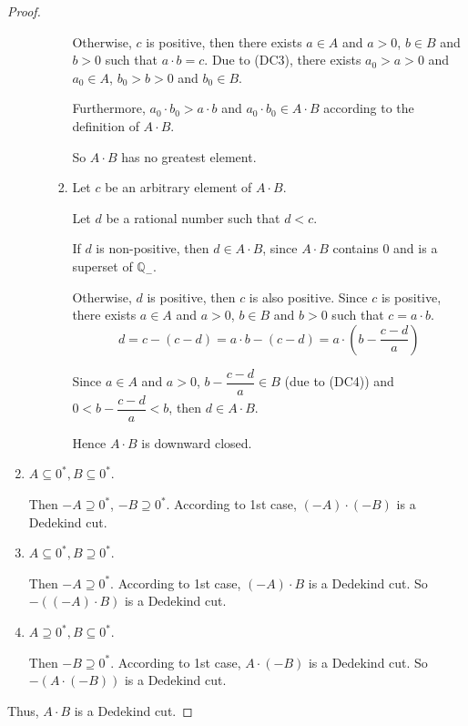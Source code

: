 \begin{proof}
\begin{enumerate}[label={\textbf{Case \arabic*.}},itemindent={0.5cm}]
\begin{enumerate}
\begin{enumerate}[label = (\roman*)]
                                  Otherwise, $c$ is positive, then there exists $a\in A$ and $a > 0$, $b\in B$ and $b > 0$ such that $a\cdot b = c$. Due to (DC3), there exists $a_{0} > a > 0$ and $a_{0}\in A$, $b_{0} > b > 0$ and $b_{0}\in B$.

                                  Furthermore, $a_{0}\cdot b_{0} > a\cdot b$ and $a_{0}\cdot b_{0}\in A\cdot B$ according to the definition of $A\cdot B$.

                                  So $A\cdot B$ has no greatest element.
                            \item Let $c$ be an arbitrary element of $A\cdot B$.

                                  Let $d$ be a rational number such that $d < c$.

                                  If $d$ is non-positive, then $d\in A\cdot B$, since $A\cdot B$ contains $0$ and is a superset of $\mathbb{Q}_{-}$.

                                  Otherwise, $d$ is positive, then $c$ is also positive. Since $c$ is positive, there exists $a\in A$ and $a > 0$, $b\in B$ and $b > 0$ such that $c = a\cdot b$.
                                  \[
                                      d = c - (c - d) = a\cdot b - (c - d) = a\cdot\left(b - \frac{c - d}{a}\right)
                                  \]

                                  Since $a\in A$ and $a > 0$, $b - \dfrac{c - d}{a}\in B$ (due to (DC4)) and $0 < b - \dfrac{c - d}{a} < b$, then $d \in A\cdot B$.

                                  Hence $A\cdot B$ is downward closed.
                        \end{enumerate}
              \end{enumerate}
        \item $A\subseteq {0}^{*}, B\subseteq {0}^{*}$.

              Then $-A\supseteq {0}^{*}$, $-B\supseteq {0}^{*}$. According to 1st case, $(-A)\cdot (-B)$ is a Dedekind cut.
        \item $A\subseteq {0}^{*}, B\supseteq {0}^{*}$.

              Then $-A\supseteq {0}^{*}$. According to 1st case, $(-A)\cdot B$ is a Dedekind cut. So $-((-A)\cdot B)$ is a Dedekind cut.
        \item $A\supseteq {0}^{*}, B\subseteq {0}^{*}$.

              Then $-B\supseteq {0}^{*}$. According to 1st case, $A\cdot (-B)$ is a Dedekind cut. So $-(A\cdot (-B))$ is a Dedekind cut.
    \end{enumerate}

    Thus, $A\cdot B$ is a Dedekind cut.
\end{proof}

